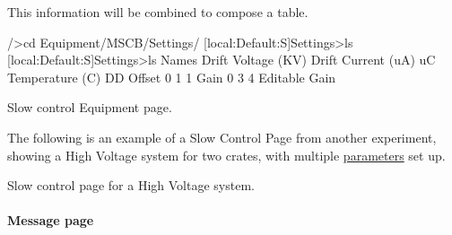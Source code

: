 This information will be combined to compose a table. 
\begin{DoxyCode}
/>cd Equipment/MSCB/Settings/
[local:Default:S]Settings>ls
[local:Default:S]Settings>ls
Names
                                Drift Voltage (KV)
                                Drift Current (uA)
                                uC Temperature (C)
DD
Offset
                                0
                                1
                                1
Gain
                                0
                                3
                                4
Editable                        Gain
\end{DoxyCode}


\par
\par
\par
 \begin{center}  Slow control Equipment page. \par
\par
\par
  \end{center}  \par
\par
\par


The following is an example of a Slow Control Page from another experiment, showing a High Voltage system for two crates, with multiple \hyperlink{structparameters}{parameters} set up.

\par
\par
\par
 \begin{center}  Slow control page for a High Voltage system. \par
\par
\par
  \end{center}  \par
\par
\par


\par




\par


\label{index_end}
\hypertarget{index_end}{}
 \paragraph{Message page}\label{RC_mhttpd_Message_page}
\label{RC_mhttpd_Message_page_idx_mhttpd_page_message}
\hypertarget{RC_mhttpd_Message_page_idx_mhttpd_page_message}{}
 \par




